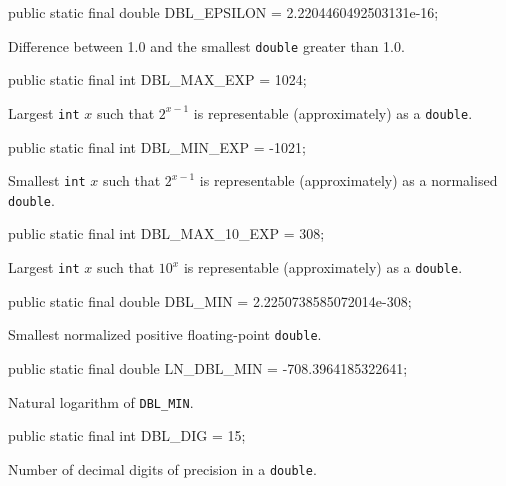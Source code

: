 \begin{code}

   public static final double DBL_EPSILON = 2.2204460492503131e-16;
\end{code}
  \begin{tabb} Difference between 1.0 and the smallest \texttt{double} greater than 1.0.
  \end{tabb}
\begin{code}

   public static final int DBL_MAX_EXP = 1024;
\end{code}
 \begin{tabb} Largest \texttt{int} $x$ such that $2^{x-1}$ is representable
  (approximately) as a \texttt{double}.
 \end{tabb}
\begin{code}

   public static final int DBL_MIN_EXP = -1021;
\end{code}
 \begin{tabb} Smallest \texttt{int} $x$ such that $2^{x-1}$ is representable
  (approximately) as a normalised \texttt{double}.
 \end{tabb}
\begin{code}

   public static final int DBL_MAX_10_EXP = 308;
\end{code}
 \begin{tabb} Largest \texttt{int} $x$ such that $10^x$ is representable
   (approximately) as a \texttt{double}.
 \end{tabb}
\begin{code}

   public static final double DBL_MIN = 2.2250738585072014e-308;
\end{code}
 \begin{tabb} Smallest normalized positive floating-point \texttt{double}.
 \end{tabb}
\begin{code}

   public static final double LN_DBL_MIN = -708.3964185322641;
\end{code}
 \begin{tabb} Natural logarithm of \texttt{DBL\_MIN}.
 \end{tabb}
\begin{code}

   public static final int DBL_DIG = 15;
\end{code}
 \begin{tabb} Number of decimal digits of precision in a \texttt{double}.
 \end{tabb}
